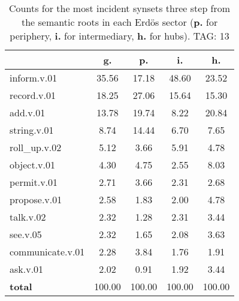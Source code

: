\begin{table}[h!]
\begin{center}
\begin{tabular}{| l | c | c | c | c |}\hline
 & g. & p. & i. & h. \\\hline
inform.v.01 & 35.56  & 17.18  & 48.60  & 23.52 \\\hline
record.v.01 & 18.25  & 27.06  & 15.64  & 15.30 \\\hline
add.v.01 & 13.78  & 19.74  & 8.22  & 20.84 \\\hline
string.v.01 & 8.74  & 14.44  & 6.70  & 7.65 \\\hline
roll\_up.v.02 & 5.12  & 3.66  & 5.91  & 4.78 \\\hline
object.v.01 & 4.30  & 4.75  & 2.55  & 8.03 \\\hline
permit.v.01 & 2.71  & 3.66  & 2.31  & 2.68 \\\hline
propose.v.01 & 2.58  & 1.83  & 2.00  & 4.78 \\\hline
talk.v.02 & 2.32  & 1.28  & 2.31  & 3.44 \\\hline
see.v.05 & 2.32  & 1.65  & 2.08  & 3.63 \\\hline
communicate.v.01 & 2.28  & 3.84  & 1.76  & 1.91 \\\hline
ask.v.01 & 2.02  & 0.91  & 1.92  & 3.44 \\\hline
{{\bf total}} & 100.00  & 100.00  & 100.00  & 100.00 \\\hline
\end{tabular}
\caption{Counts for the most incident synsets three step from the semantic roots in each Erd\"os sector ({\bf p.} for periphery, {\bf i.} for intermediary, {\bf h.} for hubs). TAG: 13}
\end{center}
\end{table}